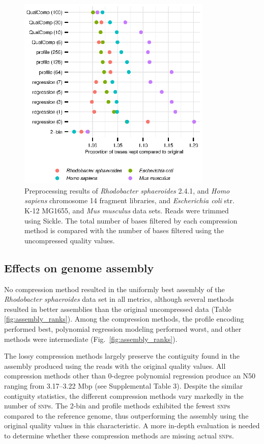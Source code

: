 \documentclass{bioinfo}
\begin{document}
\begin{figure}[!tbp]
\centerline{\includegraphics[width=3.65in]{preprocessing_results.eps}}
\caption{Preprocessing results of \textit{Rhodobacter sphaeroides}
  2.4.1, and \textit{Homo sapiens} chromosome 14 fragment libraries,
  and \textit{Escherichia coli} str. K-12 MG1655, and \textit{Mus
    musculus} data sets. Reads were trimmed using Sickle. The total
  number of bases filtered by each compression method is compared with
  the number of bases filtered using the uncompressed quality values.}
  \label{fig:preprocessing}
\end{figure}

\subsection{Effects on genome assembly}

No compression method resulted in the uniformly best assembly of the
\textit{Rhodobacter sphaeroides} data set in all metrics, although
several methods resulted in better assemblies than the original
uncompressed data (Table \ref{fig:assembly_ranks}). Among the
compression methods, the profile encoding performed best, polynomial
regression modeling performed worst, and other methods were
intermediate (Fig.~\ref{fig:assembly_ranks}).

The lossy compression methods largely preserve the contiguity found in
the assembly produced using the reads with the original quality
values. All compression methods other than 0-degree polynomial
regression produce an N50 ranging from 3.17--3.22 Mbp (see
Supplemental Table 3). Despite the similar contiguity statistics, the
different compression methods vary markedly in the number of
\textsc{snp}s. The 2-bin and profile methods exhibited the fewest
\textsc{snp}s compared to the reference genome, thus outperforming the
assembly using the original quality values in this characteristic. A
more in-depth evaluation is needed to determine whether these
compression methods are missing actual \textsc{snp}s.
\end{document}
